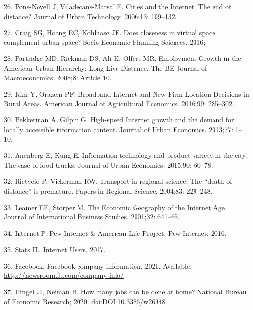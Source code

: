 \documentclass[10pt,letterpaper]{article}
\begin{document}
\leavevmode\hypertarget{ref-pons-novell_cities_2006}{}%
26. Pons-Novell J, Viladecans-Marsal E. Cities and the Internet: The end
of distance? Journal of Urban Technology. 2006;13: 109--132.

\leavevmode\hypertarget{ref-craig_does_2016}{}%
27. Craig SG, Hoang EC, Kohlhase JE. Does closeness in virtual space
complement urban space? Socio-Economic Planning Sciences. 2016;

\leavevmode\hypertarget{ref-mark_d_partridge_employment_2008}{}%
28. Partridge MD, Rickman DS, Ali K, Olfert MR. Employment Growth in the
American Urban Hierarchy: Long Live Distance. The BE Journal of
Macroeconomics. 2008;8: Article 10.

\leavevmode\hypertarget{ref-kim_broadband_2016}{}%
29. Kim Y, Orazem PF. Broadband Internet and New Firm Location Decisions
in Rural Areas. American Journal of Agricultural Economics. 2016;99:
285--302.

\leavevmode\hypertarget{ref-bekkerman_high-speed_2013}{}%
30. Bekkerman A, Gilpin G. High-speed Internet growth and the demand for
locally accessible information content. Journal of Urban Economics.
2013;77: 1--10.

\leavevmode\hypertarget{ref-anenberg_information_2015}{}%
31. Anenberg E, Kung E. Information technology and product variety in
the city: The case of food trucks. Journal of Urban Economics. 2015;90:
60--78.

\leavevmode\hypertarget{ref-rietveld_transport_2004}{}%
32. Rietveld P, Vickerman RW. Transport in regional science: The ``death
of distance'' is premature. Papers in Regional Science. 2004;83:
229--248.

\leavevmode\hypertarget{ref-edward_e_leamer_economic_2001}{}%
33. Leamer EE, Storper M. The Economic Geography of the Internet Age.
Journal of International Business Studies. 2001;32: 641--65.

\leavevmode\hypertarget{ref-pew_internet_pew_2016}{}%
34. Internet P. Pew Internet \& American Life Project. Pew Internet;
2016.

\leavevmode\hypertarget{ref-internet_live_stats_internet_2017}{}%
35. Stats IL. Internet Users. 2017.

\leavevmode\hypertarget{ref-fb}{}%
36. Facebook. Facebook company information. 2021. Available:
\url{http://newsroom.fb.com/company-info/}

\leavevmode\hypertarget{ref-dingel2020many}{}%
37. Dingel JI, Neiman B. How many jobs can be done at home? National
Bureau of Economic Research; 2020.
doi:\href{https://doi.org/DOI\%2010.3386/w26948}{DOI 10.3386/w26948}
\end{document}
